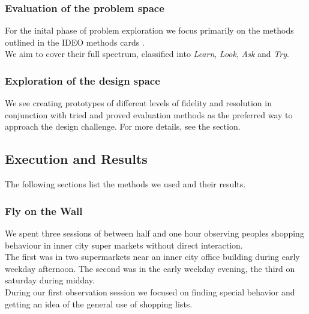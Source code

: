\documentclass{scrartcl}
\begin{document}
    \subsubsection{Evaluation of the problem space}
      For the inital phase of problem exploration we focus primarily on the methods outlined in the IDEO methods cards \cite{TODO}.\\
      We aim to cover their full spectrum, classified into \textit{Learn}, \textit{Look}, \textit{Ask} and \textit{Try}.


    \subsubsection{Exploration of the design space}
      We see creating prototypes of different levels of fidelity and resolution in conjunction with tried and proved evaluation methods as the preferred way to approach the design challenge. For more details, see the  section.

  \subsection{Execution and Results}
    The following sections list the methods we used and their results.

    \subsubsection{Fly on the Wall}
      We spent three sessions of between half and one hour observing peoples shopping behaviour in inner city super markets without direct interaction.\\
      The first was in two supermarkets near an inner city office building during early weekday afternoon.
      The second was in the early weekday evening, the third on saturday during midday.\\

      During our first observation session we focused on finding special behavior and getting an idea of the general use of shopping lists.\\
\end{document}
